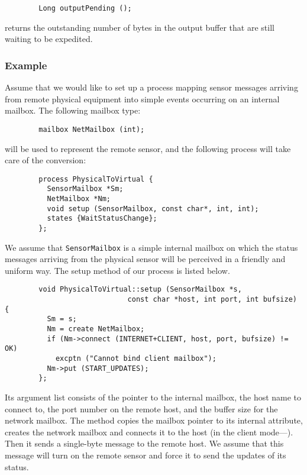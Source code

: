 \begin{verbatim}
        Long outputPending ();
\end{verbatim}
returns the outstanding number of bytes in the output buffer that are still
waiting to be expedited.

\subsubsection*{Example}

\noindent
Assume that we would like to set up a process mapping sensor messages arriving
from remote physical equipment into simple events occurring
on an internal mailbox.
The following mailbox type:
\begin{verbatim}
        mailbox NetMailbox (int);
\end{verbatim}
\noindent
will be used to represent the remote sensor, and the following process will
take care of the conversion:
\begin{verbatim}
        process PhysicalToVirtual {
          SensorMailbox *Sm;
          NetMailbox *Nm;
          void setup (SensorMailbox, const char*, int, int);
          states {WaitStatusChange};
        };
\end{verbatim}

We assume that {\tt SensorMailbox} is a simple internal mailbox on which
the status messages arriving from the physical sensor will be perceived in
a friendly and uniform way.
The setup method of our process is listed below.

\begin{verbatim}
        void PhysicalToVirtual::setup (SensorMailbox *s,
                             const char *host, int port, int bufsize) {
          Sm = s;
          Nm = create NetMailbox;
          if (Nm->connect (INTERNET+CLIENT, host, port, bufsize) != OK)
            excptn ("Cannot bind client mailbox");
          Nm->put (START_UPDATES);
        };
\end{verbatim}

\noindent
Its argument list consists of the pointer to the internal mailbox,
the host name to connect to, the port number
on the remote host, and the buffer size for the network mailbox.
The method copies the mailbox pointer to its internal attribute,
creates the network mailbox and connects it to the host (in the client
mode---).
Then it sends a single-byte message to the remote host.
We assume that this message will turn on the remote sensor and
force it to send the updates of its status.

